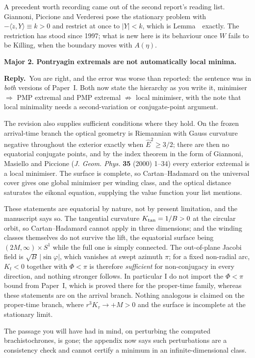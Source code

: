 \documentclass[11pt]{article}
\newcommand{\reply}{\par\noindent\textbf{Reply.}\ }
\newcommand{\R}[1]{\par\medskip\noindent\textbf{#1}\par\nopagebreak}
\begin{document}
A precedent worth recording came out of the second report's reading list.
Giannoni, Piccione and Verderesi pose the stationary problem with $-\langle\dot z,Y\rangle\equiv k>0$ and
restrict at once to $|Y|<k$, which is Lemma~\msLemCompact\ exactly. The restriction
has stood since 1997; what is new here is its behaviour once $W$ fails to be
Killing, when the boundary moves with $A(\eta)$.

\R{Major 2. Pontryagin extremals are not automatically local minima.}
\reply You are right, and the error was worse than reported: the sentence was in
\emph{both} versions of Paper~I. Both now state the hierarchy as you write it,
minimiser $\Rightarrow$ PMP extremal and PMP extremal $\nRightarrow$ local
minimiser, with the note that local minimality needs a second-variation or
conjugate-point argument.

The revision also supplies sufficient conditions where they hold. On the frozen
arrival-time branch the optical geometry is Riemannian with Gauss curvature negative
throughout the exterior exactly when $\hat E^2\ge3/2$; there are then no equatorial
conjugate points, and by the index theorem in the form of Giannoni, Masiello and
Piccione (\emph{J. Geom. Phys.} \textbf{35} (2000) 1--34) every exterior extremal is
a local minimiser. The surface is complete, so Cartan--Hadamard on the universal
cover gives one global minimiser per winding class, and the optical distance
saturates the eikonal equation, supplying the value function your list mentions.

These statements are equatorial by nature, not by present limitation, and the
manuscript says so. The tangential curvature $K_{\rm tan}=1/B>0$ at the circular
orbit, so Cartan--Hadamard cannot apply in three dimensions; and the winding classes
themselves do not survive the lift, the equatorial surface being
$(2M,\infty)\times S^1$ while the full one is simply connected. The out-of-plane
Jacobi field is $\sqrt{B}\,|\sin\varphi|$, which vanishes at swept azimuth $\pi$;
for a fixed non-radial arc, $K_t<0$ together with $\Phi<\pi$ is therefore
\emph{sufficient} for non-conjugacy in every direction, and nothing stronger
follows. In particular I do not import the $\Phi<\pi$ bound from Paper~I, which is
proved there for the proper-time family, whereas these statements are on the
arrival branch. Nothing analogous is claimed on the proper-time branch, where
$r^3K_\tau\to+M>0$ and the surface is incomplete at the stationary limit.

The passage you will have had in mind, on perturbing the computed brachistochrones,
is gone; the appendix now says such perturbations are a consistency check and cannot
certify a minimum in an infinite-dimensional class.
\end{document}
